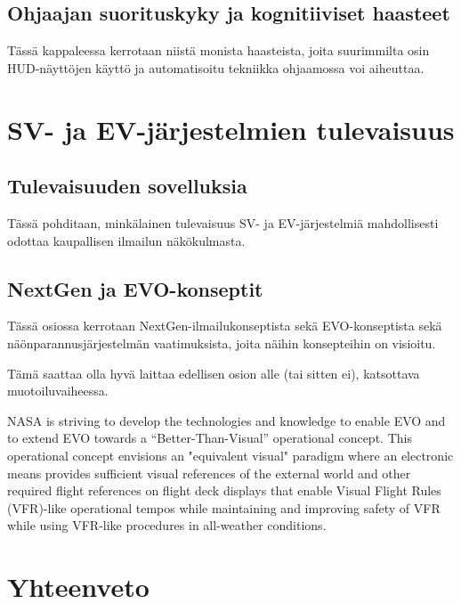 \documentclass[utf8,bachelor,manualbib]{gradu3}
\begin{document}
\section{Ohjaajan suorituskyky ja kognitiiviset haasteet}

Tässä kappaleessa kerrotaan niistä monista haasteista, joita suurimmilta osin HUD-näyttöjen käyttö ja automatisoitu tekniikka ohjaamossa voi aiheuttaa.


\chapter{SV- ja EV-järjestelmien tulevaisuus}

\section{Tulevaisuuden sovelluksia}

Tässä pohditaan, minkälainen tulevaisuus SV- ja EV-järjestelmiä mahdollisesti odottaa kaupallisen ilmailun näkökulmasta.

\section{NextGen ja EVO-konseptit}

Tässä osiossa kerrotaan NextGen-ilmailukonseptista sekä EVO-konseptista sekä näönparannusjärjestelmän vaatimuksista, joita näihin konsepteihin on visioitu.

Tämä saattaa olla hyvä laittaa edellisen osion alle (tai sitten ei), katsottava muotoiluvaiheessa.

NASA is striving to develop the technologies and knowledge to enable EVO and to extend EVO towards a “Better-Than-Visual” operational concept. This operational concept envisions an "equivalent visual" paradigm where an electronic means provides sufficient visual references of the external world and other required flight references on flight deck displays that enable Visual Flight Rules (VFR)-like operational tempos while maintaining and improving safety of VFR while using VFR-like procedures in all-weather conditions.\citep{prinzel2013}


\chapter{Yhteenveto}


\end{document}
